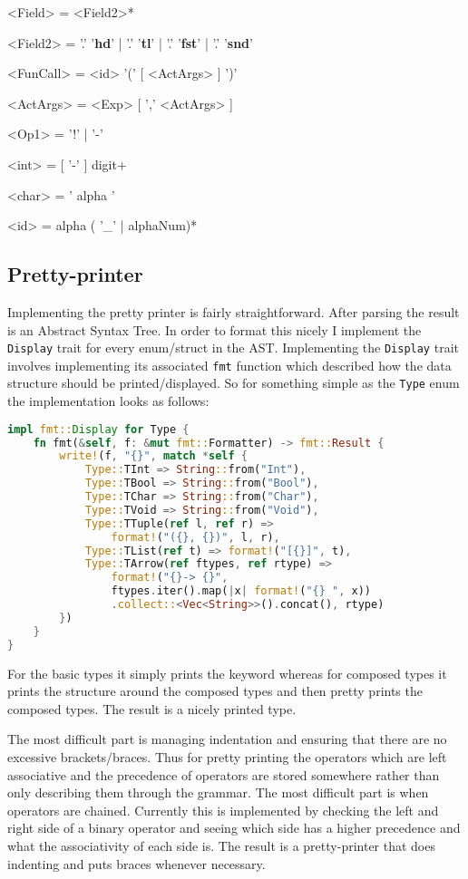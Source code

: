 \documentclass{article}
\begin{document}
\begin{grammar}
	<Field> = <Field2>*

	<Field2> = '.' '\textbf{hd}' | '.' '\textbf{tl}' | '.' '\textbf{fst}' | '.' '\textbf{snd}'

	<FunCall> = <id> '(' [ <ActArgs> ] ')'

	<ActArgs> = <Exp> [ ',' <ActArgs> ]

	<Op1> = '!' | '-'

	<int> = [ '-' ] digit+

	<char> = ' alpha '

	<id> = alpha ( '\_' | alphaNum)*
\end{grammar}

\subsection{Pretty-printer}
Implementing the pretty printer is fairly straightforward. After parsing the result is an Abstract Syntax Tree. In order to format this nicely I implement the \texttt{Display} trait for every enum/struct in the AST. Implementing the \texttt{Display} trait involves implementing its associated \texttt{fmt} function which described how the data structure should be printed/displayed. So for something simple as the \texttt{Type} enum the implementation looks as follows:
\begin{lstlisting}[language=Rust, style=boxed]
impl fmt::Display for Type {
	fn fmt(&self, f: &mut fmt::Formatter) -> fmt::Result {
		write!(f, "{}", match *self {
			Type::TInt => String::from("Int"),
			Type::TBool => String::from("Bool"),
			Type::TChar => String::from("Char"),
			Type::TVoid => String::from("Void"),
			Type::TTuple(ref l, ref r) =>
				format!("({}, {})", l, r),
			Type::TList(ref t) => format!("[{}]", t),
			Type::TArrow(ref ftypes, ref rtype) =>
				format!("{}-> {}",
				ftypes.iter().map(|x| format!("{} ", x))
				.collect::<Vec<String>>().concat(), rtype)
		})
	}
}
\end{lstlisting}
For the basic types it simply prints the keyword whereas for composed types it prints the structure around the composed types and then pretty prints the composed types. The result is a nicely printed type.

The most difficult part is managing indentation and ensuring that there are no excessive brackets/braces. Thus for pretty printing the operators which are left associative and the precedence of operators are stored somewhere rather than only describing them through the grammar. The most difficult part is when operators are chained. Currently this is implemented by checking the left and right side of a binary operator and seeing which side has a higher precedence and what the associativity of each side is. The result is a pretty-printer that does indenting and puts braces whenever necessary.
\end{document}
